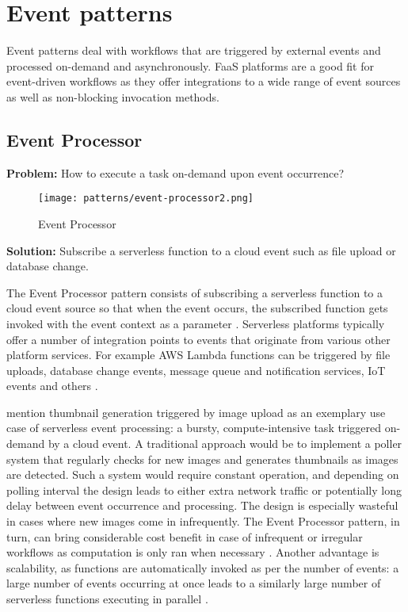 \section{Event patterns} \label{sec:eventPatterns}

Event patterns deal with workflows that are triggered by external events and processed on-demand and asynchronously. FaaS platforms are a good fit for event-driven workflows as they offer integrations to a wide range of event sources as well as non-blocking invocation methods.

\subsection{Event Processor} \label{subsec:Eventprocessing}

\textbf{Problem:} How to execute a task on-demand upon event occurrence?

\begin{figure}[h]
  \centering
  \texttt{[image: patterns/event-processor2.png]}
  \caption{Event Processor}
  \label{fig:patternEventProcessor}
\end{figure}

\textbf{Solution:} Subscribe a serverless function to a cloud event such as file upload or database change.

The Event Processor pattern consists of subscribing a serverless function to a cloud event source so that when the event occurs, the subscribed function gets invoked with the event context as a parameter \parencite{hong18securingviaserverlesspatterns}. Serverless platforms typically offer a number of integration points to events that originate from various other platform services. For example AWS Lambda functions can be triggered by file uploads, database change events, message queue and notification services, IoT events and others \parencite{awslambda0218}.

\textcite{baldini17currentTrends} mention thumbnail generation triggered by image upload as an exemplary use case of serverless event processing: a bursty, compute-intensive task triggered on-demand by a cloud event. A traditional approach would be to implement a poller system that regularly checks for new images and generates thumbnails as images are detected. Such a system would require constant operation, and depending on polling interval the design leads to either extra network traffic or potentially long delay between event occurrence and processing. The design is especially wasteful in cases where new images come in infrequently. The Event Processor pattern, in turn, can bring considerable cost benefit in case of infrequent or irregular workflows as computation is only ran when necessary \parencite{hong18securingviaserverlesspatterns}. Another advantage is scalability, as functions are automatically invoked as per the number of events: a large number of events occurring at once leads to a similarly large number of serverless functions executing in parallel \parencite{hong18securingviaserverlesspatterns}.

